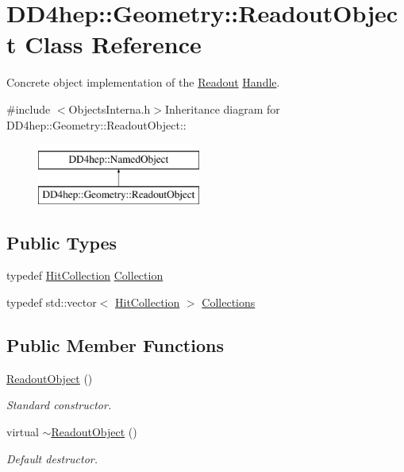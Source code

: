 \hypertarget{class_d_d4hep_1_1_geometry_1_1_readout_object}{
\section{DD4hep::Geometry::ReadoutObject Class Reference}
\label{class_d_d4hep_1_1_geometry_1_1_readout_object}
}


Concrete object implementation of the \hyperlink{class_d_d4hep_1_1_geometry_1_1_readout}{Readout} \hyperlink{class_d_d4hep_1_1_handle}{Handle}.  


{\ttfamily \#include $<$ObjectsInterna.h$>$}Inheritance diagram for DD4hep::Geometry::ReadoutObject::\begin{figure}[H]
\begin{center}
\leavevmode
\includegraphics[height=2cm]{class_d_d4hep_1_1_geometry_1_1_readout_object}
\end{center}
\end{figure}
\subsection*{Public Types}
\begin{DoxyCompactItemize}
\item 
typedef \hyperlink{class_d_d4hep_1_1_geometry_1_1_hit_collection}{HitCollection} \hyperlink{class_d_d4hep_1_1_geometry_1_1_readout_object_a3789c1e548f014ce44e2af9ff12f9757}{Collection}
\item 
typedef std::vector$<$ \hyperlink{class_d_d4hep_1_1_geometry_1_1_hit_collection}{HitCollection} $>$ \hyperlink{class_d_d4hep_1_1_geometry_1_1_readout_object_a1093be792a71654cf6116686b0ab7cb6}{Collections}
\end{DoxyCompactItemize}
\subsection*{Public Member Functions}
\begin{DoxyCompactItemize}
\item 
\hyperlink{class_d_d4hep_1_1_geometry_1_1_readout_object_a996d7d31d97422f508786b6ba827fb84}{ReadoutObject} ()
\begin{DoxyCompactList}\small\item\em Standard constructor. \item\end{DoxyCompactList}\item 
virtual \hyperlink{class_d_d4hep_1_1_geometry_1_1_readout_object_a5a3ba52dd04797f7b3125688d0496507}{$\sim$ReadoutObject} ()
\begin{DoxyCompactList}\small\item\em Default destructor. \item\end{DoxyCompactList}\end{DoxyCompactItemize}
